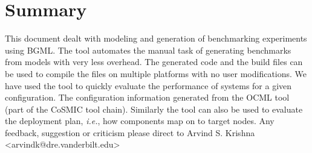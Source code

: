 \documentclass[onecolumn]{article}
\begin{document}
\section* {Summary}
This document dealt with modeling and generation of benchmarking
experiments using BGML. The tool automates the manual task of
generating benchmarks from models with very less overhead. The
generated code and the build files can be used to compile the files on
multiple platforms with no user modifications. We have used the tool
to quickly evaluate the performance of systems for a given configuration.
The configuration information generated from the OCML tool (part of the
CoSMIC tool chain). Similarly the tool can also be used to evaluate the
deployment plan, {\em i.e.}, how components map on to target nodes. Any
feedback, suggestion or criticism please direct to
Arvind S. Krishna <arvindk@dre.vanderbilt.edu>
\end{document}
